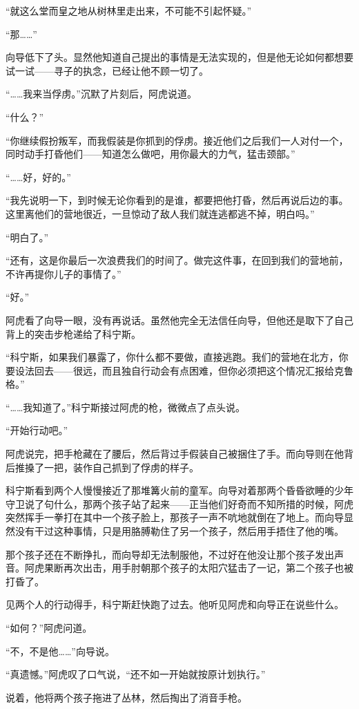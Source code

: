“就这么堂而皇之地从树林里走出来，不可能不引起怀疑。”

“那……”

向导低下了头。显然他知道自己提出的事情是无法实现的，但是他无论如何都想要试一试——寻子的执念，已经让他不顾一切了。

“……我来当俘虏。”沉默了片刻后，阿虎说道。

“什么？”

“你继续假扮叛军，而我假装是你抓到的俘虏。接近他们之后我们一人对付一个，同时动手打昏他们——知道怎么做吧，用你最大的力气，猛击颈部。”

“……好，好的。”

“我先说明一下，到时候无论你看到的是谁，都要把他打昏，然后再说后边的事。这里离他们的营地很近，一旦惊动了敌人我们就连逃都逃不掉，明白吗。”

“明白了。”

“还有，这是你最后一次浪费我们的时间了。做完这件事，在回到我们的营地前，不许再提你儿子的事情了。”

“好。”

阿虎看了向导一眼，没有再说话。虽然他完全无法信任向导，但他还是取下了自己背上的突击步枪递给了科宁斯。

“科宁斯，如果我们暴露了，你什么都不要做，直接逃跑。我们的营地在北方，你要设法回去——很远，而且独自行动会有点困难，但你必须把这个情况汇报给克鲁格。”

“……我知道了。”科宁斯接过阿虎的枪，微微点了点头说。

“开始行动吧。”

阿虎说完，把手枪藏在了腰后，然后背过手假装自己被捆住了手。而向导则在他背后推搡了一把，装作自己抓到了俘虏的样子。

科宁斯看到两个人慢慢接近了那堆篝火前的童军。向导对着那两个昏昏欲睡的少年守卫说了句什么，那两个孩子站了起来——正当他们好奇而不知所措的时候，阿虎突然挥手一拳打在其中一个孩子脸上，那孩子一声不吭地就倒在了地上。而向导显然没有干过这种事情，只是用胳膊勒住了另一个孩子，然后用手捂住了他的嘴。

那个孩子还在不断挣扎，而向导却无法制服他，不过好在他没让那个孩子发出声音。阿虎果断再次出击，用手肘朝那个孩子的太阳穴猛击了一记，第二个孩子也被打昏了。

见两个人的行动得手，科宁斯赶快跑了过去。他听见阿虎和向导正在说些什么。

“如何？”阿虎问道。

“不，不是他……”向导说。

“真遗憾。”阿虎叹了口气说，“还不如一开始就按原计划执行。”

说着，他将两个孩子拖进了丛林，然后掏出了消音手枪。

